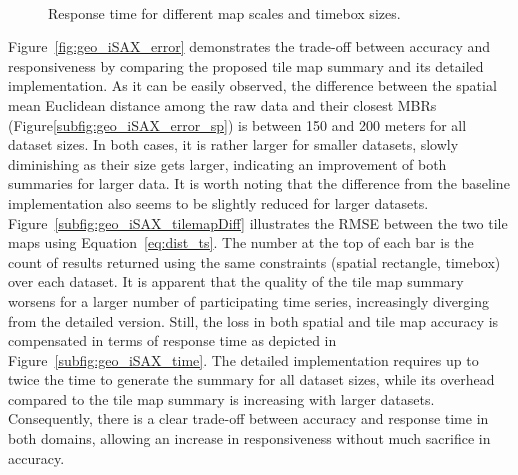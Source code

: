 \begin{figure}[!t]
 \centering
 \
\caption{Response time for different map scales and timebox sizes.}
\label{fig:geo_iSAX_zoom_timebox}
\end{figure}

Figure~\ref{fig:geo_iSAX_error} demonstrates the  trade-off between accuracy and responsiveness by comparing the proposed tile map summary and its detailed implementation. As it can be easily observed, the difference between the spatial mean Euclidean distance among the raw data and their closest MBRs (Figure\ref{subfig:geo_iSAX_error_sp}) is between 150 and 200 meters for all dataset sizes. In both cases, it is rather larger for smaller datasets, slowly diminishing as their size gets larger, indicating an improvement of both summaries for larger data. It is worth noting that the difference from the baseline implementation also seems to be slightly reduced for larger datasets. Figure~\ref{subfig:geo_iSAX_tilemapDiff} illustrates the RMSE between the two tile maps using Equation~\ref{eq:dist_ts}. The number at the top of each bar is the count of results returned using the same constraints (spatial rectangle, timebox) over each dataset. It is apparent that the quality of the tile map summary worsens for a larger number of participating time series, increasingly diverging from the detailed version. Still, the loss in both spatial and tile map accuracy is compensated in terms of response time as depicted in Figure~\ref{subfig:geo_iSAX_time}. The detailed implementation requires up to twice the time to generate the summary for all dataset sizes, while its overhead compared to the tile map summary is increasing with larger datasets. Consequently, there is a clear trade-off between accuracy and response time in both domains, allowing an increase in responsiveness without much sacrifice in accuracy.

